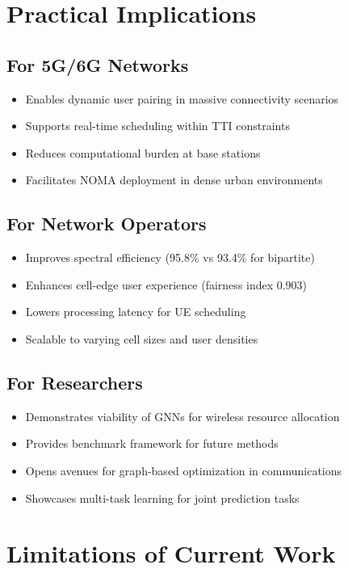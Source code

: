 \section{Practical Implications}

\subsection{For 5G/6G Networks}
\begin{itemize}
    \item Enables dynamic user pairing in massive connectivity scenarios
    \item Supports real-time scheduling within TTI constraints
    \item Reduces computational burden at base stations
    \item Facilitates NOMA deployment in dense urban environments
\end{itemize}

\subsection{For Network Operators}
\begin{itemize}
    \item Improves spectral efficiency (95.8\% vs 93.4\% for bipartite)
    \item Enhances cell-edge user experience (fairness index 0.903)
    \item Lowers processing latency for UE scheduling
    \item Scalable to varying cell sizes and user densities
\end{itemize}

\subsection{For Researchers}
\begin{itemize}
    \item Demonstrates viability of GNNs for wireless resource allocation
    \item Provides benchmark framework for future methods
    \item Opens avenues for graph-based optimization in communications
    \item Showcases multi-task learning for joint prediction tasks
\end{itemize}

\section{Limitations of Current Work}

